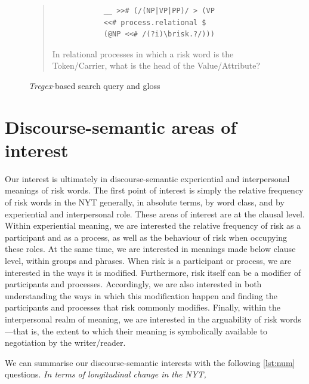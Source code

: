 
			\begin{figure}
			\begin{quote}
			\begin{multicols}{2}
			\begin{verbatim}
			__ >># (/(NP|VP|PP)/ > (VP
			<<# process.relational $ 
			(@NP <<# /(?i)\brisk.?/)))
			\end{verbatim}
			\noindent In relational processes in which a risk word is the Token/Carrier, what is the head of the Value\slash Attribute?
			\end{multicols}
			\end{quote}
			\caption{\emph{Tregex}-based search query and gloss}
			\label{fig:glossed}
			\end{figure}

			\section{Discourse-semantic areas of interest}

				Our interest is ultimately in discourse-semantic experiential and interpersonal meanings of risk words. The first point of interest is simply the relative frequency of risk words in the NYT generally, in absolute terms, by word class, and by experiential and interpersonal role. These areas of interest are at the clausal level. Within experiential meaning, we are interested the relative frequency of risk as a participant and as a process, as well as the behaviour of risk when occupying these roles. At the same time, we are interested in meanings made below clause level, within groups and phrases. When risk is a participant or process, we are interested in the ways it is modified. Furthermore, risk itself can be a modifier of participants and processes. Accordingly, we are also interested in both understanding the ways in which this modification happen and finding the participants and processes that risk commonly modifies. Finally, within the interpersonal realm of meaning, we are interested in the arguability of risk words---that is, the extent to which their meaning is symbolically available to negotiation by the writer\slash reader.

				We can summarise our discourse-semantic interests with the following \ref{lst:num} questions. \emph{In terms of longitudinal change in the NYT,}

